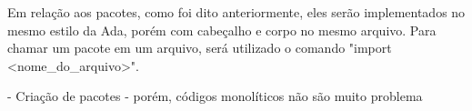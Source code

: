 Em relação aos pacotes, como foi dito anteriormente, eles serão implementados no mesmo estilo da Ada, porém com cabeçalho e corpo no mesmo arquivo. Para chamar um pacote em um arquivo, será utilizado o comando "import <nome_do_arquivo>".

- Criação de pacotes - porém, códigos monolíticos não são muito problema